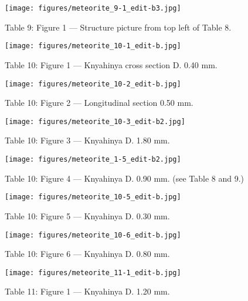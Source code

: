 \documentclass[a4paper, 12pt, oneside]{article}
\begin{document}
\clearpage
{}
\begin{figure}[t]
\texttt{[image: figures/meteorite\_9-1\_edit-b3.jpg]}
\caption{Table 9: Figure 1 --- Structure picture from top left of Table 8.}
\centering
\end{figure}
\clearpage
{}
\begin{figure}[t]
\texttt{[image: figures/meteorite\_10-1\_edit-b.jpg]}
\caption{Table 10: Figure 1 --- Knyahinya cross section D. 0.40 mm.}
\centering
\end{figure}
\clearpage
\begin{figure}[t]
\texttt{[image: figures/meteorite\_10-2\_edit-b.jpg]}
\caption{Table 10: Figure 2 --- Longitudinal section 0.50 mm.}
\centering
\end{figure}
\clearpage
\begin{figure}[t]
\texttt{[image: figures/meteorite\_10-3\_edit-b2.jpg]}
\caption{Table 10: Figure 3 --- Knyahinya D. 1.80 mm.}
\centering
\end{figure}
\clearpage
\begin{figure}[t]
\texttt{[image: figures/meteorite\_1-5\_edit-b2.jpg]}
\caption{Table 10: Figure 4 --- Knyahinya D. 0.90 mm. (see Table 8 and 9.)}
\centering
\end{figure}
\clearpage
\begin{figure}[t]
\texttt{[image: figures/meteorite\_10-5\_edit-b.jpg]}
\caption{Table 10: Figure 5 --- Knyahinya D. 0.30 mm.}
\centering
\end{figure}
\clearpage
\begin{figure}[t]
\texttt{[image: figures/meteorite\_10-6\_edit-b.jpg]}
\caption{Table 10: Figure 6 --- Knyahinya D. 0.80 mm.}
\centering
\end{figure}
\clearpage
{}
\begin{figure}[t]
\texttt{[image: figures/meteorite\_11-1\_edit-b.jpg]}
\caption{Table 11: Figure 1 --- Knyahinya D. 1.20 mm.}
\centering
\end{figure}
\end{document}
